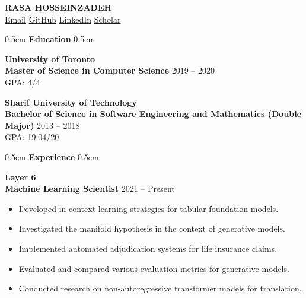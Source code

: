 \documentclass[11pt,a4paper]{article}
\newcommand{\cvsection}[1]{%
    \vspace{10pt}
    \noindent\hfill\kern0.5em
    {\Huge \textbf{\textcolor{maincolor}{#1}}}%
    \kern0.5em\hfill\vspace{8pt}
}
\begin{document}
\RaggedRight %

\begin{center}
    {\Huge \textbf{\MakeUppercase{Rasa Hosseinzadeh}}} \\[5pt]
    \href{mailto:rasa.hosseinzadeh@gmail.com}{\textcolor{maincolor}{\faEnvelope}\hspace{0.5em} Email} \hspace{1.5em}
    \href{https://github.com/rasaHosseinzadeh}{\textcolor{maincolor}{\faGithub}\hspace{0.5em} GitHub} \hspace{1.5em}
    \href{https://linkedin.com/in/rasa-hosseinzadeh-6204a6208}{\textcolor{maincolor}{\faLinkedin}\hspace{0.5em} LinkedIn} \hspace{1.5em}
    \href{https://scholar.google.com/citations?user=1Evd7mYAAAAJ}{\textcolor{maincolor}{\faGraduationCap}\hspace{0.5em} Scholar}
\end{center}
\vspace{15pt}

\cvsection{Education}

{\Large \textbf{\textcolor{maincolor}{University of Toronto}}} \\
\textbf{Master of Science in Computer Science} \hfill 2019 -- 2020 \\
GPA: 4/4 \\
\vspace{8pt}

{\Large \textbf{\textcolor{maincolor}{Sharif University of Technology}}} \\
\textbf{Bachelor of Science in Software Engineering and Mathematics (Double Major)} \hfill 2013 -- 2018 \\
GPA: 19.04/20 \\
\vspace{15pt}

\cvsection{Experience}

{\Large \textbf{\textcolor{maincolor}{Layer 6}}} \\
\textbf{Machine Learning Scientist} \hfill 2021 -- Present
\begin{itemize}[noitemsep, topsep=4pt, leftmargin=1.5em, label=\textcolor{maincolorlight}{$\circ$}]
    \item Developed in-context learning strategies for tabular foundation models.
    \item Investigated the manifold hypothesis in the context of generative models.
    \item Implemented automated adjudication systems for life insurance claims.
    \item Evaluated and compared various evaluation metrics for generative models.
    \item Conducted research on non-autoregressive transformer models for translation.
\end{itemize}
\vspace{10pt}
\end{document}
